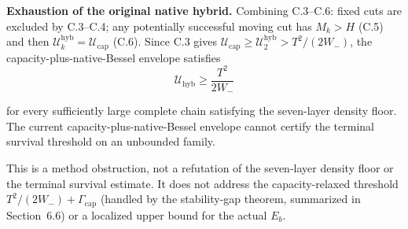\textbf{Exhaustion of the original native hybrid.} Combining C.3--C.6: fixed cuts
are excluded by C.3--C.4; any potentially successful moving cut has
$M_k>H$ (C.5) and then $\mathcal U_k^{\mathrm{hyb}}=\mathcal U_{\mathrm{cap}}$
(C.6). Since C.3 gives $\mathcal U_{\mathrm{cap}}\ge\mathcal U_2^{\mathrm{hyb}}>T^2/(2W_-)$,
the capacity-plus-native-Bessel envelope satisfies
\begin{equation*}
\mathcal U_{\mathrm{hyb}}\ge\frac{T^2}{2W_-}
\end{equation*}

for every sufficiently large complete chain satisfying the seven-layer
density floor. The current capacity-plus-native-Bessel envelope cannot
certify the terminal survival threshold on an unbounded family.

This is a method obstruction, not a refutation of the
seven-layer density floor or the terminal survival estimate. It does not
address the capacity-relaxed threshold
$T^2/(2W_-)+\Gamma_{\mathrm{cap}}$ (handled by the stability-gap theorem,
summarized in Section~6.6) or a localized upper bound for the actual $E_b$.
